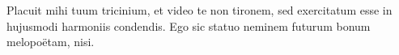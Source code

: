 \documentclass[fontsize=11pt, pagesize=false]{book}
\begin{document}

\beginnumbering
\pstart
{}
\pend\pstart
Placuit mihi tuum tricinium, et video te non tironem, sed exercitatum esse in hujusmodi harmoniis condendis. Ego sic statuo neminem futurum bonum melopoëtam, nisi.
\pend
\endnumbering


\printindex[persona]
\end{document}
